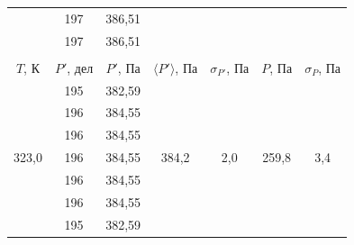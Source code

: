\documentclass[a4paper, 12pt]{article}
\begin{document}
\begin{table}[H]
\begin{tabular}{ccccccc}
                \multicolumn{1}{|c|}{} & \multicolumn{1}{c|}{197} & \multicolumn{1}{c|}{386,51} & \multicolumn{1}{c|}{} & \multicolumn{1}{c|}{} & \multicolumn{1}{c|}{} & \multicolumn{1}{c|}{} \\ \cline{2-3}
                \multicolumn{1}{|c|}{} & \multicolumn{1}{c|}{197} & \multicolumn{1}{c|}{386,51} & \multicolumn{1}{c|}{} & \multicolumn{1}{c|}{} & \multicolumn{1}{c|}{} & \multicolumn{1}{c|}{} \\ \hline
                &
    		&
    		&
    		&
    		&
    		&
    		\\ \hline
    		\multicolumn{1}{|c|}{$ T $, К} &
    		\multicolumn{1}{c|}{$ P' $, дел} &
    		\multicolumn{1}{c|}{$ P' $, Па} &
    		\multicolumn{1}{c|}{$ \langle P' \rangle $, Па} &
    		\multicolumn{1}{c|}{$ \sigma_{P'} $, Па} &
    		\multicolumn{1}{c|}{$ P $, Па} &
    		\multicolumn{1}{c|}{$ \sigma_P $, Па} \\ \hline
                \multicolumn{1}{|c|}{\multirow{10}{*}{323,0}} & \multicolumn{1}{c|}{195} & \multicolumn{1}{c|}{382,59} & \multicolumn{1}{c|}{\multirow{10}{*}{384,2}} & \multicolumn{1}{c|}{\multirow{10}{*}{2,0}} & \multicolumn{1}{c|}{\multirow{10}{*}{259,8}} & \multicolumn{1}{c|}{\multirow{10}{*}{3,4}} \\ \cline{2-3}
                \multicolumn{1}{|c|}{} & \multicolumn{1}{c|}{196} & \multicolumn{1}{c|}{384,55} & \multicolumn{1}{c|}{} & \multicolumn{1}{c|}{} & \multicolumn{1}{c|}{} & \multicolumn{1}{c|}{} \\ \cline{2-3}
                \multicolumn{1}{|c|}{} & \multicolumn{1}{c|}{196} & \multicolumn{1}{c|}{384,55} & \multicolumn{1}{c|}{} & \multicolumn{1}{c|}{} & \multicolumn{1}{c|}{} & \multicolumn{1}{c|}{} \\ \cline{2-3}
                \multicolumn{1}{|c|}{} & \multicolumn{1}{c|}{196} & \multicolumn{1}{c|}{384,55} & \multicolumn{1}{c|}{} & \multicolumn{1}{c|}{} & \multicolumn{1}{c|}{} & \multicolumn{1}{c|}{} \\ \cline{2-3}
                \multicolumn{1}{|c|}{} & \multicolumn{1}{c|}{196} & \multicolumn{1}{c|}{384,55} & \multicolumn{1}{c|}{} & \multicolumn{1}{c|}{} & \multicolumn{1}{c|}{} & \multicolumn{1}{c|}{} \\ \cline{2-3}
                \multicolumn{1}{|c|}{} & \multicolumn{1}{c|}{196} & \multicolumn{1}{c|}{384,55} & \multicolumn{1}{c|}{} & \multicolumn{1}{c|}{} & \multicolumn{1}{c|}{} & \multicolumn{1}{c|}{} \\ \cline{2-3}
                \multicolumn{1}{|c|}{} & \multicolumn{1}{c|}{195} & \multicolumn{1}{c|}{382,59} & \multicolumn{1}{c|}{} & \multicolumn{1}{c|}{} & \multicolumn{1}{c|}{} & \multicolumn{1}{c|}{} \\ \cline{2-3}

\end{tabular}
\end{table}
\end{document}
